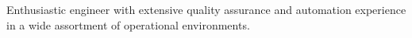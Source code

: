 

\begin{cvparagraph}

Enthusiastic engineer with extensive quality assurance and automation
experience in a wide assortment of operational environments.
\end{cvparagraph}